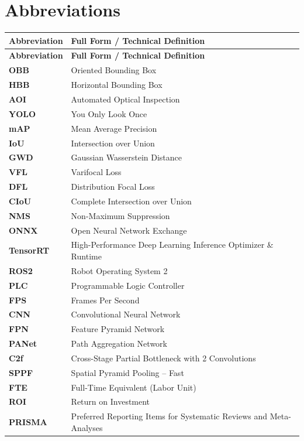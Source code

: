 \chapter*{Abbreviations}
\singlespacing
\small
\setlength{\tabcolsep}{6pt}
\renewcommand{\arraystretch}{1.25}
\noindent\begin{longtable}{@{}p{3.2cm}p{11.8cm}@{}}
\textbf{Abbreviation} & \textbf{Full Form / Technical Definition}\\[4pt]
\endfirsthead
\textbf{Abbreviation} & \textbf{Full Form / Technical Definition}\\[4pt]
\endhead
\textbf{OBB} & Oriented Bounding Box\\
\textbf{HBB} & Horizontal Bounding Box\\
\textbf{AOI} & Automated Optical Inspection\\
\textbf{YOLO} & You Only Look Once\\
\textbf{mAP} & Mean Average Precision\\
\textbf{IoU} & Intersection over Union\\
\textbf{GWD} & Gaussian Wasserstein Distance\\
\textbf{VFL} & Varifocal Loss\\
\textbf{DFL} & Distribution Focal Loss\\
\textbf{CIoU} & Complete Intersection over Union\\
\textbf{NMS} & Non-Maximum Suppression\\
\textbf{ONNX} & Open Neural Network Exchange\\
\textbf{TensorRT} & High-Performance Deep Learning Inference Optimizer \& Runtime\\
\textbf{ROS2} & Robot Operating System 2\\
\textbf{PLC} & Programmable Logic Controller\\
\textbf{FPS} & Frames Per Second\\
\textbf{CNN} & Convolutional Neural Network\\
\textbf{FPN} & Feature Pyramid Network\\
\textbf{PANet} & Path Aggregation Network\\
\textbf{C2f} & Cross-Stage Partial Bottleneck with 2 Convolutions\\
\textbf{SPPF} & Spatial Pyramid Pooling -- Fast\\
\textbf{FTE} & Full-Time Equivalent (Labor Unit)\\
\textbf{ROI} & Return on Investment\\
\textbf{PRISMA} & Preferred Reporting Items for Systematic Reviews and Meta-Analyses\\
\end{longtable}
\normalsize
\onehalfspacing
\clearpage
